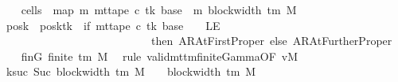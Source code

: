 \begin{isabellebody}
\ \ \isamarkupfalse%
\ {\isacharquery}{\kern0pt}cells{}\ {\isacharequal}{\kern0pt}\ {\isachardoublequoteopen}map\ {\isacharparenleft}{\kern0pt}{\isasymlambda}m{\isachardot}{\kern0pt}\ mt{\isacharunderscore}{\kern0pt}tape\ c{\isacharprime}{\kern0pt}\ tk\ {\isacharparenleft}{\kern0pt}base\ {\isacharplus}{\kern0pt}\ m{\isacharparenright}{\kern0pt}{\isacharparenright}{\kern0pt}\ {\isacharbrackleft}{\kern0pt}{}{\isachardot}{\kern0pt}{\isachardot}{\kern0pt}{\isacharless}{\kern0pt}block{\isacharunderscore}{\kern0pt}width\ {\isacharparenleft}{\kern0pt}{\isasymGamma}{\isacharunderscore}{\kern0pt}tm\ M{\isacharparenright}{\kern0pt}\ {\isacharminus}{\kern0pt}\ {}{\isacharbrackright}{\kern0pt}{\isachardoublequoteclose}\isanewline
\ \ \isamarkupfalse%
\ {\isacharquery}{\kern0pt}posk{\isacharprime}{\kern0pt}\ {\isacharequal}{\kern0pt}\ {\isachardoublequoteopen}posk{\isacharparenleft}{\kern0pt}tk\ {\isacharcolon}{\kern0pt}{\isacharequal}{\kern0pt}\ if\ mt{\isacharunderscore}{\kern0pt}tape\ c{\isacharprime}{\kern0pt}\ tk\ {\isacharparenleft}{\kern0pt}base\ {\isacharminus}{\kern0pt}\ {}{\isacharparenright}{\kern0pt}\ {\isacharequal}{\kern0pt}\ LE{}\isanewline
\ \ \ \ \ \ \ \ \ \ \ \ \ \ \ \ \ \ \ \ \ \ \ \ \ \ \ then\ AR{\isacharunderscore}{\kern0pt}AtFirstProper\ else\ AR{\isacharunderscore}{\kern0pt}AtFurtherProper{\isacharparenright}{\kern0pt}{\isachardoublequoteclose}\isanewline
\ \ \isamarkupfalse%
\ finG{\isacharcolon}{\kern0pt}\ {\isachardoublequoteopen}finite\ {\isacharparenleft}{\kern0pt}{\isasymGamma}{\isacharunderscore}{\kern0pt}tm\ M{\isacharparenright}{\kern0pt}{\isachardoublequoteclose}\ \isamarkupfalse%
\ {\isacharparenleft}{\kern0pt}rule\ valid{\isacharunderscore}{\kern0pt}mttm{\isacharunderscore}{\kern0pt}finite{\isacharunderscore}{\kern0pt}Gamma{\isacharbrackleft}{\kern0pt}OF\ vM{\isacharbrackright}{\kern0pt}{\isacharparenright}{\kern0pt}\isanewline
\ \ \isamarkupfalse%
\ ksuc{\isacharcolon}{\kern0pt}\ {\isachardoublequoteopen}Suc\ {\isacharparenleft}{\kern0pt}block{\isacharunderscore}{\kern0pt}width\ {\isacharparenleft}{\kern0pt}{\isasymGamma}{\isacharunderscore}{\kern0pt}tm\ M{\isacharparenright}{\kern0pt}\ {\isacharminus}{\kern0pt}\ {}{\isacharparenright}{\kern0pt}\ {\isacharequal}{\kern0pt}\ block{\isacharunderscore}{\kern0pt}width\ {\isacharparenleft}{\kern0pt}{\isasymGamma}{\isacharunderscore}{\kern0pt}tm\ M{\isacharparenright}{\kern0pt}{\isachardoublequoteclose}\isanewline
\ \ \ \ \isamarkupfalse%

\end{isabellebody}
